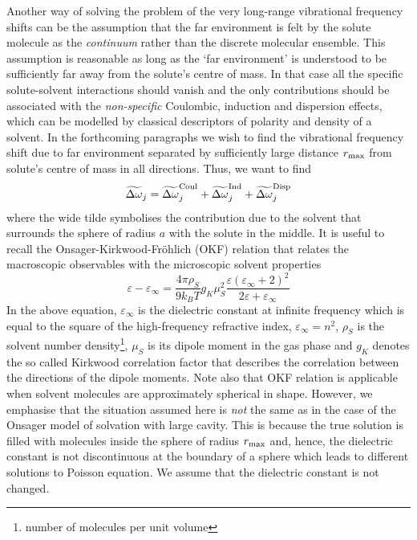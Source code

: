 \documentclass[b5paper,oneside,fleqn,11pt]{book}
\begin{document}
\begin{refsection}
Another way of solving the problem of the very long\hyp{}range
vibrational frequency shifts can be the assumption that the
far environment is felt by the solute molecule as the \emph{continuum}
rather than the discrete molecular ensemble. This assumption
is reasonable as long as the `far environment'
is understood to be sufficiently far away from the solute's
centre of mass. In that case all the specific solute\hyp{}solvent
interactions should vanish and the only contributions should be
associated with the \emph{non\hyp{}specific} Coulombic, induction and dispersion
effects,
which can be modelled by classical descriptors of polarity and 
density of a solvent. In the forthcoming paragraphs we wish to find the
vibrational frequency shift due to far environment separated
by sufficiently large distance $r_{\rm max}$ from solute's centre of mass
in all directions. Thus, we want to find
%
\begin{equation}
 \widetilde{\Delta\omega}_j = 
\widetilde{\Delta\omega}_j^{\rm Coul} +
\widetilde{\Delta\omega}_j^{\rm Ind} +
\widetilde{\Delta\omega}_j^{\rm Disp}
\end{equation}
%
where the wide tilde symbolises the contribution
due to the solvent
that surrounds the sphere of radius $a$ with the solute
in the middle. It is useful to recall 
the Onsager\hyp{}Kirkwood\hyp{}Fr{\"o}hlich (OKF) relation \citep{Valisko.Boda.JPCB.2005}
that relates the macroscopic observables with the microscopic 
solvent properties
%
\begin{equation} \label{e:OKF}
 \varepsilon - \varepsilon_\infty = \frac{4\pi\rho_S}{9k_BT}g_K\mu_S^2 
\frac{\varepsilon(\varepsilon_\infty+2)^2}{2\varepsilon+\varepsilon_\infty}
\end{equation}
%
In the above equation, $\varepsilon_\infty$ is the dielectric constant
at infinite frequency which is equal to the square 
of the high\hyp{}frequency refractive index, $\varepsilon_\infty=n^2$, 
$\rho_S$ is the solvent number density\footnote{number of molecules
per unit volume}, $\mu_S$ is
its dipole moment in the gas phase and $g_K$ denotes the so called
Kirkwood correlation factor \citep{Reis.Iglesias.PCCP.2011} 
that describes the correlation between
the directions of the dipole moments. Note also that 
OKF relation is applicable
when solvent molecules are approximately spherical in shape.
However, we emphasise that the situation assumed here
is \emph{not} the same as in the case of the Onsager model of solvation
with large cavity. This is because the true solution is filled with
molecules inside the sphere of radius $r_{\rm max}$ and, hence, the dielectric constant
is not discontinuous at the boundary of a sphere which leads to different
solutions to Poisson equation. We assume that the dielectric constant is not
changed.


\end{refsection}
\end{document}
